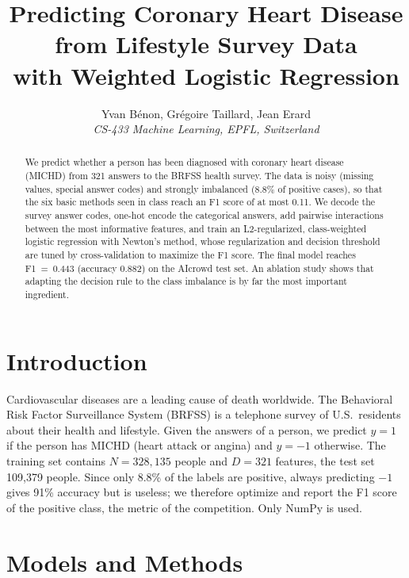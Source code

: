 \documentclass[10pt,conference,compsocconf]{IEEEtran}
\begin{document}
\title{Predicting Coronary Heart Disease from Lifestyle Survey Data\\with Weighted Logistic Regression}

\author{
  Yvan B\'enon, Gr\'egoire Taillard, Jean Erard\\
  \textit{CS-433 Machine Learning, EPFL, Switzerland}
}

\maketitle

\begin{abstract}
We predict whether a person has been diagnosed with coronary heart disease
(MICHD) from 321 answers to the BRFSS health survey. The data is noisy
(missing values, special answer codes) and strongly imbalanced (8.8\% of
positive cases), so that the six basic methods seen in class reach an F1
score of at most 0.11. We decode the survey answer codes, one-hot encode the
categorical answers, add pairwise interactions between the most informative
features, and train an L2-regularized, class-weighted logistic regression with
Newton's method, whose regularization and decision threshold are tuned by
cross-validation to maximize the F1 score. The final model reaches
F1~=~0.443 (accuracy 0.882) on the AIcrowd test set. An ablation study shows
that adapting the decision rule to the class imbalance is by far the most
important ingredient.
\end{abstract}

\section{Introduction}
Cardiovascular diseases are a leading cause of death worldwide. The
Behavioral Risk Factor Surveillance System (BRFSS) is a telephone survey
of U.S.\ residents about their health and lifestyle. Given the answers of
a person, we predict $y=1$ if the person has MICHD (heart attack or
angina) and $y=-1$ otherwise. The training set contains $N=328{,}135$
people and $D=321$ features, the test set 109{,}379 people. Since only
8.8\% of the labels are positive, always predicting $-1$ gives 91\%
accuracy but is useless; we therefore optimize and report the F1 score of
the positive class, the metric of the competition. Only NumPy is used.

\section{Models and Methods}
\end{document}

